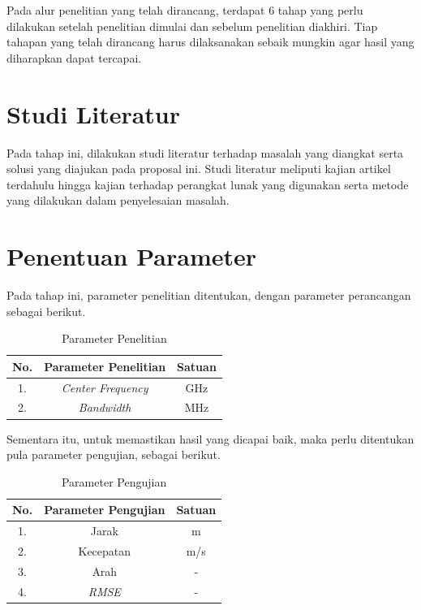 Pada alur penelitian yang telah dirancang, terdapat 6 tahap yang perlu dilakukan setelah penelitian dimulai dan sebelum penelitian diakhiri. Tiap tahapan yang telah dirancang harus dilaksanakan sebaik mungkin agar hasil yang diharapkan dapat tercapai.


\section{Studi Literatur}
Pada tahap ini, dilakukan studi literatur terhadap masalah yang diangkat serta solusi yang diajukan pada proposal ini. Studi literatur meliputi kajian artikel terdahulu hingga kajian terhadap perangkat lunak yang digunakan serta metode yang dilakukan dalam penyelesaian masalah.
	
\section{Penentuan Parameter}

Pada tahap ini, parameter penelitian ditentukan, dengan parameter perancangan sebagai berikut.

\begin{center}
	\begin{longtable}{| c | c | c |}
		\caption{Parameter Penelitian}
		\label{tab:param}\\
		\hline
		No. & Parameter Penelitian 			& Satuan\\ \hline
		1.  &\textit{Center Frequency}	   	& GHz\\
		2.  &\textit{Bandwidth} 			& MHz \\
		\hline
	\end{longtable}
\end{center}

Sementara itu, untuk memastikan hasil yang dicapai baik, maka perlu ditentukan pula parameter pengujian, sebagai berikut.

\begin{center}
	\begin{longtable}{| c | c | c |}
		\caption{Parameter Pengujian}
		\label{tab:paramUji}\\
		\hline
		No. & Parameter Pengujian		& Satuan\\ \hline
		1.  &Jarak	   					& m\\
		2.  &Kecepatan 					& m/s\\
		3.  &Arah						& -\\
		4.  &\textit{RMSE}				& -\\
		\hline
	\end{longtable}
\end{center}


